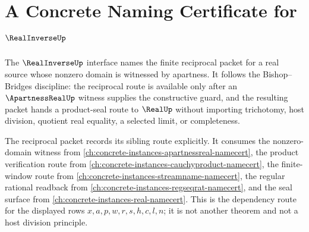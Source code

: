 \chapter{A Concrete Naming Certificate for $\RealInverseUp$}
\label{ch:concrete-instances-realinverse-namecert}

The $\RealInverseUp$ interface names the finite reciprocal packet for a real source whose nonzero domain is witnessed by apartness. It follows the Bishop--Bridges discipline: the reciprocal route is available only after an $\ApartnessRealUp$ witness supplies the constructive guard, and the resulting packet hands a product-seal route to $\RealUp$ without importing trichotomy, host division, quotient real equality, a selected limit, or completeness.

The reciprocal packet records its sibling route explicitly. It consumes the nonzero-domain witness from \autoref{ch:concrete-instances-apartnessreal-namecert}, the product verification route from \autoref{ch:concrete-instances-cauchyproduct-namecert}, the finite-window route from \autoref{ch:concrete-instances-streamname-namecert}, the regular rational readback from \autoref{ch:concrete-instances-regseqrat-namecert}, and the seal surface from \autoref{ch:concrete-instances-real-namecert}. This is the dependency route for the displayed rows $x,a,p,w,r,s,h,c,l,n$; it is not another theorem and not a host division principle.

